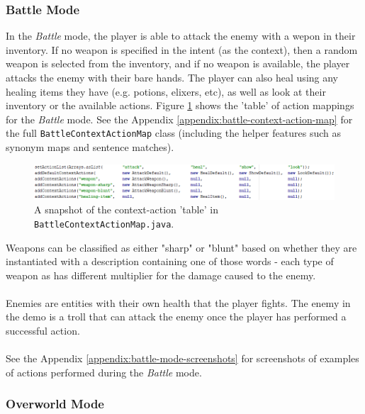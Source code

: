 \documentclass[11pt]{article}
\begin{document}
\subsubsection{Battle Mode}

In the \textit{Battle} mode, the player is able to attack the enemy with a wepon in their inventory. If no weapon is specified in the intent (as the context), then a random weapon is selected from the inventory, and if no weapon is available, the player attacks the enemy with their bare hands. The player can also heal using any healing items they have (e.g. potions, elixers, etc), as well as look at their inventory or the available actions. Figure \ref{fig:battle-context-action-map} shows the 'table' of action mappings for the \textit{Battle} mode. See the Appendix \ref{appendix:battle-context-action-map} for the full \texttt{BattleContextActionMap} class (including the helper features such as synonym maps and sentence matches).

\begin{center}
\begin{figure}[H]
\begin{center}
  \includegraphics[width=\linewidth]{battle-context-action-map.png}
  \caption{A snapshot of the context-action 'table' in \texttt{BattleContextActionMap.java}.}
  \label{fig:battle-context-action-map}
  \end{center}
\end{figure}
\end{center}

Weapons can be classified as either "sharp" or "blunt" based on whether they are instantiated with a description containing one of those words - each type of weapon as has different multiplier for the damage caused to the enemy.
\\
\\
Enemies are entities with their own health that the player fights. The enemy in the demo is a troll that can attack the enemy once the player has performed a successful action.
\\
\\
See the Appendix \ref{appendix:battle-mode-screenshots} for screenshots of examples of actions performed during the \textit{Battle} mode.

\subsubsection{Overworld Mode}
\end{document}
